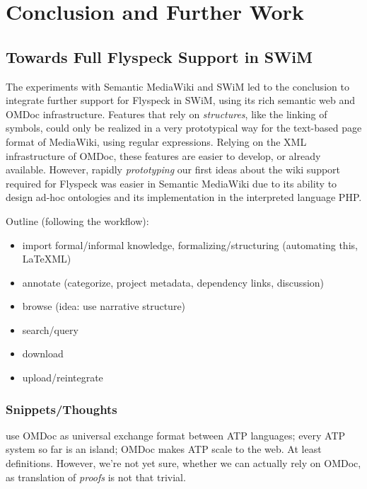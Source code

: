 
\section{Conclusion and Further Work}
\label{sec:conc}

\subsection{Towards Full Flyspeck Support in SWiM}
\label{sec:flyspeck-swim}

The experiments with Semantic MediaWiki and SWiM led to the conclusion to
integrate further support for Flyspeck in SWiM, using its rich semantic web and
OMDoc infrastructure.  Features that rely on \emph{structures}, like the linking
of symbols, could only be realized in a very prototypical way for the text-based
page format of MediaWiki, using regular expressions.  Relying on the XML
infrastructure of OMDoc, these features are easier to develop, or already
available.  However, rapidly \emph{prototyping} our first ideas about the wiki
support required for Flyspeck was easier in Semantic MediaWiki due to its
ability to design ad-hoc ontologies and its implementation in the interpreted
language PHP.

Outline (following the workflow):
\begin{itemize}
\item import formal/informal knowledge, formalizing/structuring (automating
  this, LaTeXML)
\item annotate (categorize, project metadata, dependency links, discussion)
\item browse (idea: use narrative structure)
\item search/query
\item download
\item upload/reintegrate
\end{itemize}

\subsubsection{Snippets/Thoughts}

use OMDoc as universal exchange format between ATP languages; every ATP system so far is
an island; OMDoc makes ATP scale to the web.  At least definitions.  However, we're not
yet sure, whether we can actually rely on OMDoc, as translation
of \emph{proofs} is not that trivial.


